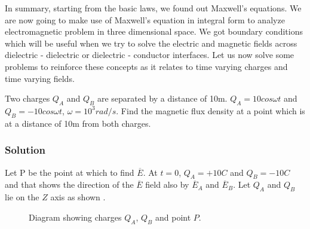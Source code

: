 In summary, starting from the basic laws, we found out Maxwell's equations. We are now going to make use of Maxwell's equation in integral form to analyze electromagnetic problem in three dimensional space. We got boundary conditions which will be useful when we try to solve the electric and magnetic fields across dielectric - dielectric or dielectric - conductor interfaces. Let us now solve some problems to reinforce these concepts as it relates to time varying charges and time varying fields.
\begin{exmp}
Two charges $Q_A$ and $Q_B$ are separated by a distance of 10m. $Q_A = 10cos\omega t$ and $Q_B = -10cos\omega t$, $\omega = 10^3 rad/s$. Find the magnetic flux density at a point which is at a distance of 10m from both charges.

\subsubsection*{Solution}
Let P be the point at which to find $\overline{E}$. At $t = 0$, $Q_A = +10C$ and $Q_B = -10C$ and that shows the direction of the $\overline{E}$ field also by $\overline{E}_{A}$ and $\overline{E}_{B}$. Let $Q_A$ and $Q_B$ lie on the $Z$ axis as shown .
\begin{figure}[h]
\centering
\caption{Diagram showing charges $Q_A$, $Q_B$ and point $P$.}
\end{figure}


\end{exmp}
